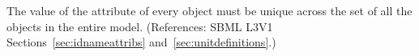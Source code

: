 The value of the  attribute of every \UnitDefinition object must
be unique across the set of all the \UnitDefinition objects in the entire
model.  (References: SBML L3V1 Sections~\ref{sec:idnameattribs}
and~\ref{sec:unitdefinitions}.)
